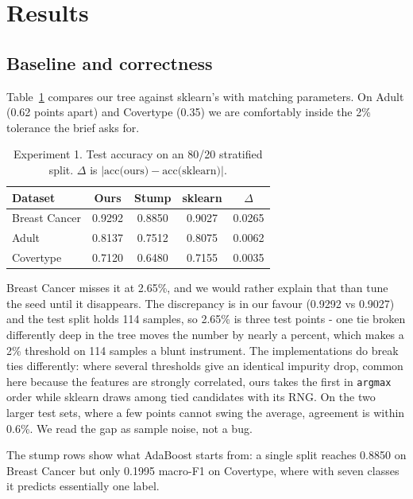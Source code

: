 \documentclass[conference]{IEEEtran}
\begin{document}
\section{Results}
\label{sec:results}

\subsection{Baseline and correctness}
Table~\ref{tab:baseline} compares our tree against sklearn's with matching
parameters.  On Adult (0.62 points apart) and Covertype (0.35) we are
comfortably inside the 2\% tolerance the brief asks for.

\begin{table}[t]
\centering
\caption{Experiment 1.  Test accuracy on an 80/20 stratified split.
$\Delta$ is $|\text{acc(ours)} - \text{acc(sklearn)}|$.}
\label{tab:baseline}
\begin{tabular}{lcccc}
\toprule
\textbf{Dataset} & \textbf{Ours} & \textbf{Stump} & \textbf{sklearn}
  & \boldmath$\Delta$\\
\midrule
Breast Cancer & 0.9292 & 0.8850 & 0.9027 & 0.0265\\
Adult         & 0.8137 & 0.7512 & 0.8075 & 0.0062\\
Covertype     & 0.7120 & 0.6480 & 0.7155 & 0.0035\\
\bottomrule
\end{tabular}
\end{table}

Breast Cancer misses it at 2.65\%, and we would rather explain that than
tune the seed until it disappears.  The discrepancy is in our favour
(0.9292 vs 0.9027) and the test split holds 114 samples, so 2.65\% is three
test points - one tie broken differently deep in the tree moves the
number by nearly a percent, which makes a 2\% threshold on 114 samples a
blunt instrument.  The implementations do break ties differently: where
several thresholds give an identical impurity drop, common here because the
features are strongly correlated, ours takes the first in \texttt{argmax}
order while sklearn draws among tied candidates with its RNG.  On the two
larger test sets, where a few points cannot swing the average, agreement is
within 0.6\%.  We read the gap as sample noise, not a bug.

The stump rows show what AdaBoost starts from: a single split reaches
0.8850 on Breast Cancer but only 0.1995 macro-F1 on Covertype, where with
seven classes it predicts essentially one label.
\end{document}
